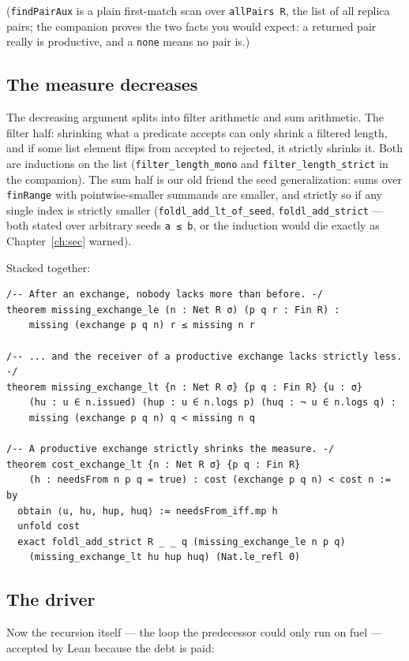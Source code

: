 \documentclass[12pt, a4paper, openright]{book}
\theoremstyle{thmstyle}
\theoremstyle{defstyle}
\newcommand{\lc}[1]{\texttt{#1}}
\begin{document}
(\lc{findPairAux} is a plain first-match scan over \lc{allPairs R}, the
list of all replica pairs; the companion proves the two facts you would
expect: a returned pair really is productive, and a \lc{none} means no
pair is.)

\subsection{The measure decreases}

The decreasing argument splits into filter arithmetic and sum
arithmetic. The filter half: shrinking what a predicate accepts can only
shrink a filtered length, and if some list element flips from accepted to
rejected, it strictly shrinks it. Both are inductions on the list
(\lc{filter_length_mono} and \lc{filter_length_strict} in the
companion). The sum half is our old friend the seed generalization: sums
over \lc{finRange} with pointwise-smaller summands are smaller, and
strictly so if any single index is strictly smaller
(\lc{foldl_add_lt_of_seed}, \lc{foldl_add_strict} --- both stated over
arbitrary seeds \lc{a ≤ b}, or the induction would die exactly as
Chapter~\ref{ch:sec} warned).

Stacked together:

\begin{verbatim}
/-- After an exchange, nobody lacks more than before. -/
theorem missing_exchange_le (n : Net R σ) (p q r : Fin R) :
    missing (exchange p q n) r ≤ missing n r

/-- ... and the receiver of a productive exchange lacks strictly less. -/
theorem missing_exchange_lt {n : Net R σ} {p q : Fin R} {u : σ}
    (hu : u ∈ n.issued) (hup : u ∈ n.logs p) (huq : ¬ u ∈ n.logs q) :
    missing (exchange p q n) q < missing n q

/-- A productive exchange strictly shrinks the measure. -/
theorem cost_exchange_lt {n : Net R σ} {p q : Fin R}
    (h : needsFrom n p q = true) : cost (exchange p q n) < cost n := by
  obtain ⟨u, hu, hup, huq⟩ := needsFrom_iff.mp h
  unfold cost
  exact foldl_add_strict R _ _ q (missing_exchange_le n p q)
    (missing_exchange_lt hu hup huq) (Nat.le_refl 0)
\end{verbatim}

\subsection{The driver}

Now the recursion itself --- the loop the predecessor could only run on
fuel --- accepted by Lean because the debt is paid:
\end{document}
